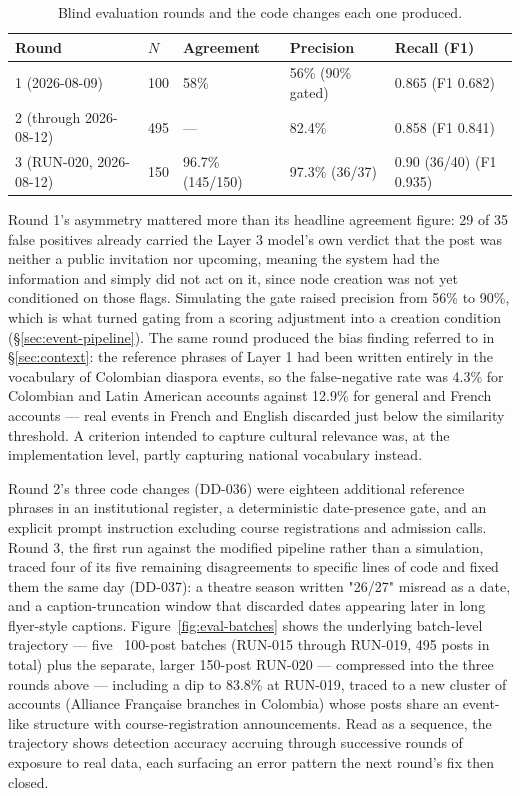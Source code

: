 \documentclass[12pt, a4paper]{report}
\begin{document}
\begin{table}[htbp]
\centering
\caption{Blind evaluation rounds and the code changes each one produced.}
\label{tab:eval-rounds}
\begin{tabular}{@{}lllll@{}}
\toprule
Round & $N$ & Agreement & Precision & Recall (F1) \\
\midrule
1 (2026-08-09) & 100 & 58\% & 56\% (90\% gated) & 0.865 (F1 0.682) \\
2 (through 2026-08-12) & 495 & — & 82.4\% & 0.858 (F1 0.841) \\
3 (RUN-020, 2026-08-12) & 150 & 96.7\% (145/150) & 97.3\% (36/37) & 0.90 (36/40) (F1 0.935) \\
\bottomrule
\end{tabular}
\end{table}

Round 1's asymmetry mattered more than its headline agreement figure: 29
of 35 false positives already carried the Layer 3 model's own verdict
that the post was neither a public invitation nor upcoming, meaning the
system had the information and simply did not act on it, since node
creation was not yet conditioned on those flags. Simulating the gate
raised precision from 56\% to 90\%, which is what turned gating from a
scoring adjustment into a creation condition
(\S\ref{sec:event-pipeline}). The same round produced the bias finding
referred to in \S\ref{sec:context}: the reference phrases of Layer 1 had
been written entirely in the vocabulary of Colombian diaspora events, so
the false-negative rate was 4.3\% for Colombian and Latin American
accounts against 12.9\% for general and French accounts — real events in
French and English discarded just below the similarity threshold. A
criterion intended to capture cultural relevance was, at the
implementation level, partly capturing national vocabulary instead.

Round 2's three code changes (DD-036) were eighteen additional reference
phrases in an institutional register, a deterministic date-presence
gate, and an explicit prompt instruction excluding course registrations
and admission calls. Round 3, the first run against the modified
pipeline rather than a simulation, traced four of its five remaining
disagreements to specific lines of code and fixed them the same day
(DD-037): a theatre season written "26/27" misread as a date, and a
caption-truncation window that discarded dates appearing later in long
flyer-style captions. Figure~\ref{fig:eval-batches} shows the underlying
batch-level trajectory — five ~100-post batches (RUN-015 through RUN-019,
495 posts in total) plus the separate, larger 150-post RUN-020 —
compressed into the three rounds above — including a dip to 83.8\% at
RUN-019, traced to a new cluster of accounts (Alliance Française
branches in Colombia) whose posts share an event-like structure with
course-registration announcements. Read as a sequence, the trajectory
shows detection accuracy accruing through successive rounds of exposure
to real data, each surfacing an error pattern the next round's fix then
closed.
\end{document}
